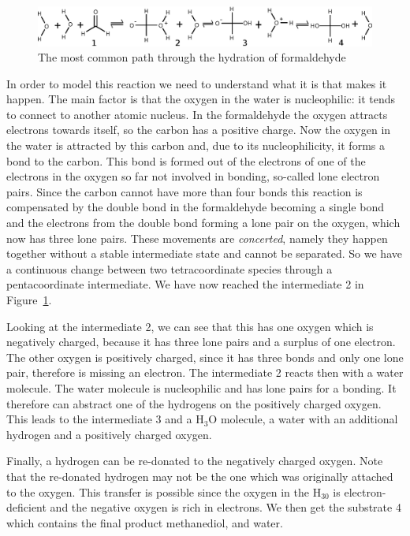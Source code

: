 \begin{figure}[h!]
  \centering
    \includegraphics[width=1\textwidth]{formaldehyde2}
  \caption{The most common path through the hydration of formaldehyde}
  \label{fig:formal2}
\end{figure}

In order to model this reaction we need to understand what it is that makes it happen. 
The main factor is that the oxygen in the water is nucleophilic: it
tends to connect to another atomic nucleus. In the formaldehyde the oxygen attracts 
electrons towards itself, 
so the carbon has a positive charge. Now the oxygen in the water is attracted by this carbon 
and, due to its nucleophilicity, it forms a bond to the carbon. This bond is formed out of the electrons of one of the electrons in the oxygen so far not involved in bonding, so-called lone electron pairs. 
Since the carbon cannot have more than four bonds this reaction is compensated by 
the double bond in the formaldehyde becoming a single bond and the electrons from the double bond 
forming a lone pair on the oxygen, which now has three lone pairs. These movements are 
\emph{concerted}, namely they happen together without a stable intermediate state
and cannot be separated. So we have a continuous change between two tetracoordinate species through a pentacoordinate intermediate.  We have now reached the intermediate 2 in Figure~\ref{fig:formal2}. 

Looking at the intermediate 2, we can see that this has one oxygen which is negatively charged, 
because it has three lone pairs and a surplus of one electron. The other oxygen is positively 
charged, since it has three bonds and only one lone pair, therefore is missing an electron. 
The intermediate 2 reacts then with a water molecule. The water molecule is nucleophilic 
and has lone pairs for a bonding. It therefore can abstract one of the hydrogens on 
the positively charged oxygen. This leads to the intermediate 3 and a $\mathrm{H_3O}$ molecule, 
a water with an additional hydrogen and a positively charged oxygen.

Finally, a hydrogen can be re-donated to the negatively charged oxygen. Note that the re-donated 
hydrogen may not be the one which was originally attached to the oxygen. This transfer 
is possible since the oxygen in the $\mathrm{H_30}$ is electron-deficient and the negative oxygen 
is rich in electrons. We then get the substrate 4 which contains the final product 
methanediol, and water.

